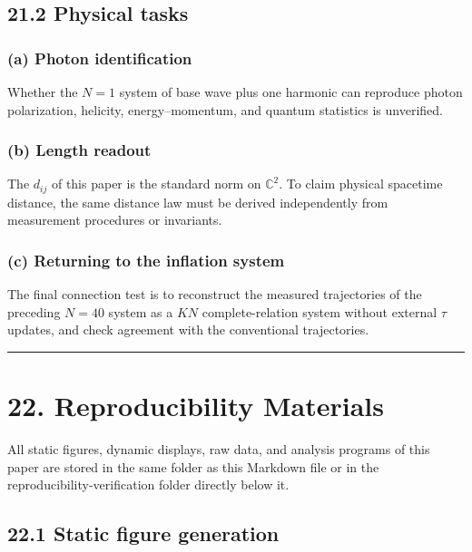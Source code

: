 \documentclass[
  a4paper,
]{article}
\begin{document}
\subsection{21.2 Physical tasks}\label{physical-tasks}

\subsubsection{(a) Photon identification}\label{a-photon-identification}

Whether the \(N=1\) system of base wave plus one harmonic can reproduce
photon polarization, helicity, energy--momentum, and quantum statistics
is unverified.

\subsubsection{(b) Length readout}\label{b-length-readout}

The \(d_{ij}\) of this paper is the standard norm on \(\mathbb C^2\). To
claim physical spacetime distance, the same distance law must be derived
independently from measurement procedures or invariants.

\subsubsection{(c) Returning to the inflation
system}\label{c-returning-to-the-inflation-system}

The final connection test is to reconstruct the measured trajectories of
the preceding \(N=40\) system as a \(KN\) complete-relation system
without external \(\tau\) updates, and check agreement with the
conventional trajectories.

\begin{center}\rule{0.5\linewidth}{0.5pt}\end{center}

\section{22. Reproducibility Materials}\label{reproducibility-materials}

All static figures, dynamic displays, raw data, and analysis programs of
this paper are stored in the same folder as this Markdown file or in the
reproducibility-verification folder directly below it.

\subsection{22.1 Static figure
generation}\label{static-figure-generation}
\end{document}
